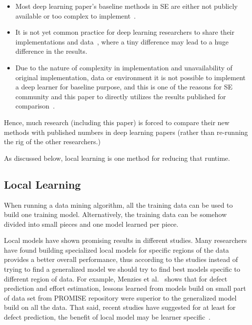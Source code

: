 \documentclass[sigconf]{acmart}
\newcommand{\bi}{\begin{itemize}[leftmargin=0.4cm]}
\newcommand{\ei}{\end{itemize}}
\theoremstyle{break}
\begin{document}
    \bi
    \item Most deep learning paper's baseline methods in SE are either not publicly available or too complex to implement~\cite{white2016deep,lam2015combining}.
    \item It is not yet common practice for deep learning researchers to share their implementations and data~\cite{white2016deep,white2015toward,lam2015combining,wang2016automatically,choetkiertikul2016deep,gu2016deep},  where a tiny difference may lead to a huge difference in the results.
    \item Due to the nature of complexity in implementation and unavailability of original implementation, data or environment it is not possible to implement a deep learner for baseline purpose, and this is one of the reasons for SE community and this paper to directly utilizes the results published for comparison~\cite{lam2015combining,fu2017easy}.
    \ei
    Hence, much research (including this paper) is forced to compare their new methods with published numbers in deep learning papers (rather than re-running the rig of the other  researchers.)
    
    
    As discussed below,
    local learning is one method for reducing that runtime.
    
     

   
    
   
 
    
    \subsection{Local Learning}
    When running a data mining algorithm, all the training data can be used to build one training model. Alternatively,
    the training data can be somehow divided into small pieces and one model learned per piece.
    
    Local models have shown promising results in different studies. Many researchers have found building specialized local models for specific regions of the data provides a better overall performance, thus according to the studies instead of trying to find a generalized model we should try to find best models specific to different region of data. 
    For example, Menzies et al.~\cite{menzieslocal} shows that for defect prediction and effort estimation, lessons learned from models build on small part of data set from PROMISE repository were superior to the generalized model build on all the data.
    That said,
    recent studies have suggested for at least for defect prediction, the benefit of local model may be learner specific~\cite{herbold2017global}.
    
\end{document}
